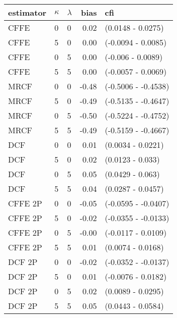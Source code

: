 \begin{tabular}{lllrl}
  \hline
estimator & $\kappa$ & $\lambda$ & bias & cfi \\ 
  \hline
CFFE  & 0 & 0 & 0.02 & (0.0148 - 0.0275) \\ 
  CFFE  & 5 & 0 & 0.00 & (-0.0094 - 0.0085) \\ 
  CFFE  & 0 & 5 & 0.00 & (-0.006 - 0.0089) \\ 
  CFFE  & 5 & 5 & 0.00 & (-0.0057 - 0.0069) \\ 
  MRCF  & 0 & 0 & -0.48 & (-0.5006 - -0.4538) \\ 
  MRCF  & 5 & 0 & -0.49 & (-0.5135 - -0.4647) \\ 
  MRCF  & 0 & 5 & -0.50 & (-0.5224 - -0.4752) \\ 
  MRCF  & 5 & 5 & -0.49 & (-0.5159 - -0.4667) \\ 
  DCF  & 0 & 0 & 0.01 & (0.0034 - 0.0221) \\ 
  DCF  & 5 & 0 & 0.02 & (0.0123 - 0.033) \\ 
  DCF  & 0 & 5 & 0.05 & (0.0429 - 0.063) \\ 
  DCF  & 5 & 5 & 0.04 & (0.0287 - 0.0457) \\ 
  CFFE 2P  & 0 & 0 & -0.05 & (-0.0595 - -0.0407) \\ 
  CFFE 2P  & 5 & 0 & -0.02 & (-0.0355 - -0.0133) \\ 
  CFFE 2P  & 0 & 5 & -0.00 & (-0.0117 - 0.0109) \\ 
  CFFE 2P  & 5 & 5 & 0.01 & (0.0074 - 0.0168) \\ 
  DCF 2P  & 0 & 0 & -0.02 & (-0.0352 - -0.0137) \\ 
  DCF 2P  & 5 & 0 & 0.01 & (-0.0076 - 0.0182) \\ 
  DCF 2P  & 0 & 5 & 0.02 & (0.0089 - 0.0295) \\ 
  DCF 2P  & 5 & 5 & 0.05 & (0.0443 - 0.0584) \\ 
   \hline
\end{tabular}
